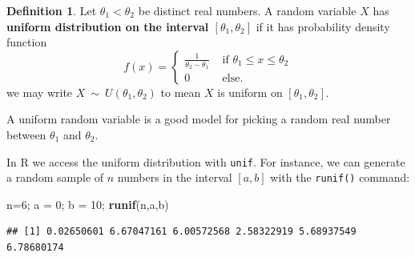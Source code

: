 \documentclass[
]{book}
\newenvironment{Shaded}{\begin{snugshade}}{\end{snugshade}}
\newcommand{\DecValTok}[1]{\textcolor[rgb]{0.00,0.00,0.81}{#1}}
\newcommand{\FunctionTok}[1]{\textcolor[rgb]{0.13,0.29,0.53}{\textbf{#1}}}
\newcommand{\NormalTok}[1]{#1}
\newcommand{\OtherTok}[1]{\textcolor[rgb]{0.56,0.35,0.01}{#1}}
\theoremstyle{definition}
\newtheorem{definition}{Definition}[chapter]
\theoremstyle{definition}
\theoremstyle{definition}
\theoremstyle{definition}
\theoremstyle{remark}
\begin{document}
\begin{definition}
\protect\hypertarget{def:uniform-distribution}{}\label{def:uniform-distribution}Let \(\theta_1 < \theta_2\) be distinct real numbers. A random variable \(X\) has \textbf{uniform distribution on the interval \([\theta_1,\theta_2]\)} if it has probability density function
\[
f(x)=
\begin{cases}
\frac{1}{\theta_2 - \theta_1} &\text{ if }\theta_1 \leq x \leq \theta_2 \\
0 &\text{ else.} 
\end{cases}
\]
we may write \(X ~\sim~ U(\theta_1,\theta_2)\) to mean \(X\) is uniform on \([\theta_1,\theta_2]\).
\end{definition}

A uniform random variable is a good model for picking a random real number between \(\theta_1\) and \(\theta_2\).

In R we access the uniform distribution with \texttt{unif}. For instance, we can generate a random sample of \(n\) numbers in the interval \([a,b]\) with the \texttt{runif()} command:

\begin{Shaded}
\begin{Highlighting}[]
\NormalTok{n}\OtherTok{=}\DecValTok{6}\NormalTok{; a }\OtherTok{=} \DecValTok{0}\NormalTok{; b }\OtherTok{=} \DecValTok{10}\NormalTok{;}
\FunctionTok{runif}\NormalTok{(n,a,b)}
\end{Highlighting}
\end{Shaded}

\begin{verbatim}
## [1] 0.02650601 6.67047161 6.00572568 2.58322919 5.68937549 6.78680174
\end{verbatim}
\end{document}
